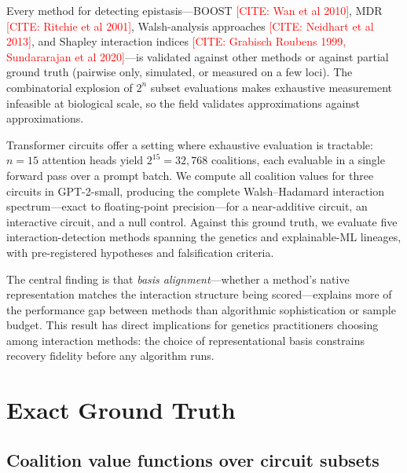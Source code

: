 \documentclass[11pt]{article}
\newcommand{\citeneeded}[1]{\textcolor{red}{[CITE: #1]}}
\begin{document}

Every method for detecting epistasis---BOOST \citeneeded{Wan et al 2010},
MDR \citeneeded{Ritchie et al 2001}, Walsh-analysis approaches
\citeneeded{Neidhart et al 2013}, and Shapley interaction indices
\citeneeded{Grabisch Roubens 1999, Sundararajan et al 2020}---is validated
against other methods or against partial ground truth (pairwise only,
simulated, or measured on a few loci). The combinatorial explosion of
$2^n$ subset evaluations makes exhaustive measurement infeasible at
biological scale, so the field validates approximations against
approximations.


Transformer circuits offer a setting where exhaustive evaluation is
tractable: $n = 15$ attention heads yield $2^{15} = 32{,}768$ coalitions,
each evaluable in a single forward pass over a prompt batch. We compute
all coalition values for three circuits in GPT-2-small, producing the
complete Walsh--Hadamard interaction spectrum---exact to floating-point
precision---for a near-additive circuit, an interactive circuit, and a
null control. Against this ground truth, we evaluate five
interaction-detection methods spanning the genetics and explainable-ML
lineages, with pre-registered hypotheses and falsification criteria.


The central finding is that \emph{basis alignment}---whether a method's
native representation matches the interaction structure being
scored---explains more of the performance gap between methods than
algorithmic sophistication or sample budget. This result has direct
implications for genetics practitioners choosing among interaction
methods: the choice of representational basis constrains recovery
fidelity before any algorithm runs.


\section{Exact Ground Truth}
\label{sec:ground-truth}


\subsection{Coalition value functions over circuit subsets}
\end{document}
